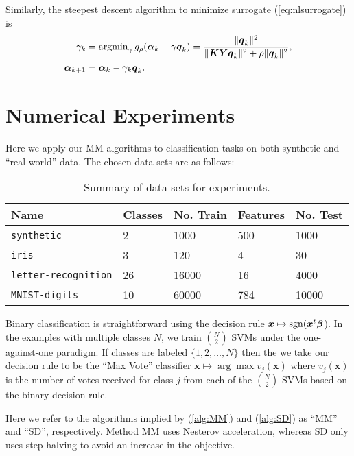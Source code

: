\documentclass[11pt]{article}
\def\sgn{\mathop{\rm sgn}\nolimits}
\def\argmin{\mathop{\rm argmin}\nolimits}
\newcommand{\bq}{\boldsymbol{q}}
\newcommand{\bx}{\boldsymbol{x}}
\newcommand{\bK}{\boldsymbol{K}}
\newcommand{\bY}{\boldsymbol{Y}}
\newcommand{\balpha}{\boldsymbol{\alpha}}
\newcommand{\bbeta}{\boldsymbol{\beta}}
\begin{document}
Similarly, the steepest descent algorithm to minimize surrogate (\ref{eq:nlsurrogate}) is
\begin{equation}
\label{alg:nlSD}
\begin{aligned}
    \gamma_{k} &= \argmin_{\gamma} g_{\rho}(\balpha_{k} - \gamma \bq_{k})
    = \frac{\|\bq_{k}\|^{2}}{\|\bK \bY \bq_{k}\|^{2} + \rho \|\bq_{k}\|^{2}}, \\
    \balpha_{k+1} &= \balpha_{k} - \gamma_{k} \bq_{k}.
\end{aligned}
\end{equation}

\section*{\center Numerical Experiments}

Here we apply our MM algorithms to classification tasks on both synthetic and ``real world'' data.
The chosen data sets are as follows:
\begin{table}[!h]
    \centering
    \begin{tabular}{lllll}
        \toprule
        Name & Classes & No. Train & Features & No. Test \\
        \midrule
        \texttt{synthetic} & 2 & 1000 & 500 & 1000 \\
        \texttt{iris} & 3 & 120 & 4 & 30 \\
        \texttt{letter-recognition} & 26 & 16000 & 16 & 4000 \\
        \texttt{MNIST-digits} & 10 & 60000 & 784 & 10000 \\
        \bottomrule
    \end{tabular}
    \caption{Summary of data sets for experiments.}
\end{table}
Binary classification is straightforward using the decision rule $\bx \mapsto \sgn (\bx^t \bbeta$).
In the examples with multiple classes $N$, we train $\binom{N}{2}$ SVMs under the one-against-one paradigm.
If classes are labeled $\{1, 2, \ldots, N\}$ then the we take our decision rule to be the ``Max Vote'' classifier $\bx \mapsto \arg\max v_{j}(\bx)$ where $v_{j}(\bx)$ is the number of votes received for class $j$ from each of the $\binom{N}{2}$ SVMs based on the binary decision rule.

Here we refer to the algorithms implied by (\ref{alg:MM}) and (\ref{alg:SD}) as ``MM'' and ``SD'', respectively.
Method MM uses Nesterov acceleration, whereas SD only uses step-halving to avoid an increase in the objective.
\end{document}
